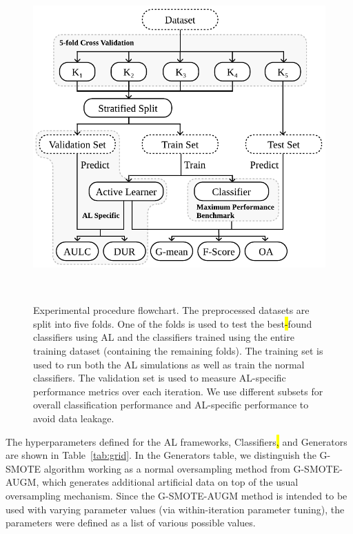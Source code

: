 \documentclass[preprint, 12pt]{elsarticle}
\begin{document}
\begin{figure}[H]
	\centering
	\includegraphics[width=.7\linewidth]{../analysis/experimental_procedure}
    \caption{%
        Experimental procedure flowchart. The preprocessed datasets are split
        into five folds. One of the folds is used to test the best\hl{-}found
        classifiers using AL and the classifiers trained using the entire
        training dataset (containing the remaining folds). The training set is
        used to run both the AL simulations as well as train the normal
        classifiers. The validation set is used to measure AL-specific
        performance metrics over each iteration. We use different subsets for
        overall classification performance and AL-specific performance to
        avoid data leakage.
    }~\label{fig:experimental_procedure}
\end{figure}

The hyperparameters defined for the AL frameworks, Classifiers\hl{,} and
Generators are shown in Table~\ref{tab:grid}. In the Generators table, we
distinguish the G-SMOTE algorithm working as a normal oversampling method from
G-SMOTE-AUGM, which generates additional artificial data on top of
the usual oversampling mechanism. Since the G-SMOTE-AUGM method is intended to
be used with varying parameter values (via within-iteration parameter tuning),
the parameters were defined as a list of various possible values.
\end{document}
